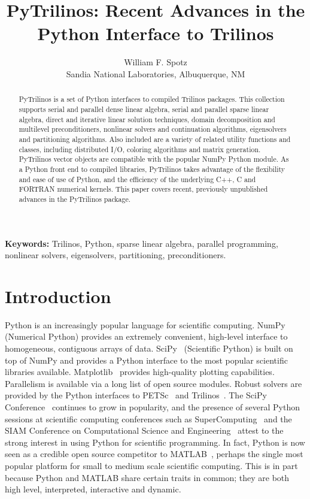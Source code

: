 \documentclass[11pt]{article}
\title{PyTrilinos: Recent Advances in the \\ Python Interface to Trilinos}
\author{William F. Spotz \\ Sandia National Laboratories, Albuquerque, NM}
\newif\ifpdf
\begin{document}
\ifpdf
\DeclareGraphicsExtensions{.pdf, .jpg, .tif}
\else
{}
\fi

\maketitle

\begin{abstract}
PyTrilinos is a set of Python interfaces to compiled Trilinos packages.  This collection supports serial and parallel dense linear algebra, serial and parallel sparse linear algebra, direct and iterative linear solution techniques, domain decomposition and multilevel preconditioners, nonlinear solvers and continuation algorithms, eigensolvers and partitioning algorithms.  Also included are a variety of related utility functions and classes, including distributed I/O, coloring algorithms and matrix generation.  PyTrilinos vector objects are compatible with the popular NumPy Python module.  As a Python front end to compiled libraries, PyTrilinos takes advantage of the flexibility and ease of use of Python, and the efficiency of the underlying C++, C and FORTRAN numerical kernels.  This paper covers recent, previously unpublished advances in the PyTrilinos package.
\end{abstract}

{\bf Keywords:} Trilinos, Python, sparse linear algebra, parallel programming, nonlinear solvers, eigensolvers, partitioning, preconditioners.

\section{Introduction}
\label{sec:introduction}

Python is an increasingly popular language for scientific computing.  NumPy~\cite{NumPyGuide} (Numerical Python) provides an extremely convenient, high-level interface to homogeneous, contiguous arrays of data.  SciPy~\cite{SciPyRefGuide} (Scientific Python) is built on top of NumPy and provides a Python interface to the most popular scientific libraries available.  Matplotlib~\cite{Matplotlib} provides high-quality plotting capabilities.  Parallelism is available via a long list of open source modules.  Robust solvers are provided by the Python interfaces to PETSc~\cite{PETScUserRef} and Trilinos~\cite{Trilinos}.  The SciPy Conference~\cite{SciPyConference} continues to grow in popularity, and the presence of several Python sessions at scientific computing conferences such as SuperComputing~\cite{SuperComputing} and the SIAM Conference on Computational Science and Engineering~\cite{SIAM_CSE} attest to the strong interest in using Python for scientific programming.  In fact, Python is now seen as a credible open source competitor to MATLAB~\cite{MATLAB}, perhaps the single most popular platform for small to medium scale scientific computing.  This is in part because Python and MATLAB share certain traits in common; they are both high level, interpreted, interactive and dynamic.
\end{document}
